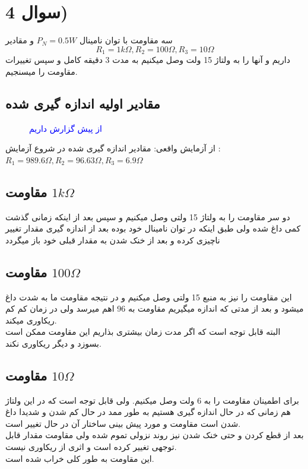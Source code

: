 \section{سوال 4)}
سه مقاومت با توان نامینال $P_N = 0.5W$ و مقادیر
$$R_1 = 1k\Omega,R_2=100\Omega,R_3=10\Omega$$
داریم و آنها را به ولتاژ 15 ولت وصل میکنیم به مدت
3 دقیقه کامل و  سپس تغییرات مقاومت را میسنجیم.

\subsection*{\textbf{مقادیر اولیه اندازه گیری شده}}
\begin{figure}[h]
    \centering
    \caption{\textcolor{blue}{از پیش گزارش داریم}}
\end{figure}
از آزمایش واقعی:
مقادیر اندازه گیری شده در شروع آزمایش : $R_1 =989.6\Omega  , R_2=96.63\Omega , R_3=6.9 \Omega$
\subsection{مقاومت $1k\Omega$}
دو سر مقاومت را به ولتاژ 15 ولتی وصل میکنیم و سپس 
بعد از اینکه زمانی گذشت کمی داغ شده ولی طبق اینکه
در توان نامینال خود بوده بعد از اندازه گیری مقدار تغییر 
ناچیزی کرده و بعد از خنک شدن به مقدار قبلی خود باز میگردد\\
\subsection{مقاومت $100\Omega$}
این مقاومت را نیز به منبع 15 ولتی وصل میکنیم و در نتیجه مقاومت ما به شدت داغ میشود و بعد از مدتی
که اندازه میگیریم مقاومت به 96 اهم میرسد ولی در زمان کم کم ریکاوری میکند.\\
البته قابل توجه است که اگر مدت زمان بیشتری بذاریم این مقاومت ممکن است بسوزد و دیگر ریکاوری نکند.\\
\subsection{مقاومت $10\Omega$}
برای اطمینان مقاومت را به 6 ولت وصل میکنیم. ولی قابل توجه است که در این ولتاژ هم زمانی که
در حال اندازه گیری هستیم به طور ممد در حال کم شدن و شدیدا داغ شدن است مقاومت و مورد پیش بینی 
ساختار آن در حال تغییر است.\\
بعد از قطع کردن و حتی خنک شدن نیز روند نزولی تموم شده ولی مقاومت مقدار قابل توجهی تغییر کرده است
و اثری از ریکاوری نیست.\\
این مقاومت به طور کلی خراب شده است.\\

\pagebreak